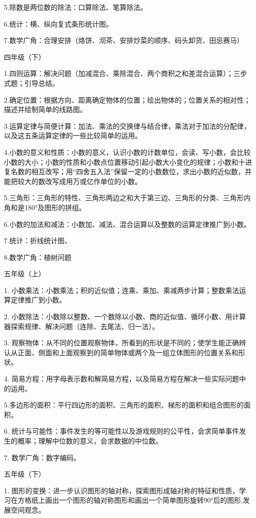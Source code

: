 5.除数是两位数的除法：口算除法、笔算除法。

6.统计：横、纵向复式条形统计图。

7.数学广角：合理安排（烙饼、沏茶、安排炒菜的顺序、码头卸货、田忌赛马）

四年级（下）

1.四则运算：解决问题（加减混合、乘除混合、两个商积之和差混合运算）；三步式题；引导总结。

2.确定位置：根据方向、距离确定物体的位置；绘出物体的；位置关系的相对性；描述并绘制简单的线路图。

3.运算定律与简便计算：加法、乘法的交换律与结合律，乘法对于加法的分配律，以及这五条运算定律的一些比较简单的运用。

4.小数的意义和性质：小数的意义，认识小数的计数单位，会读、写小数，会比较小数的大小；小数的性质和小数点位置移动引起小数大小变化的规律；小数和十进复名数的相互改写；用“四舍五入法”保留一定的小数数位，求出小数的近似数，并能把较大的数改写成用万或亿作单位的小数。

5.三角形：三角形的特性、三角形两边之和大于第三边、三角形的分类、三角形内角和是180°及图形的拼组。

6.小数的加法和减法：小数加、减法、混合运算以及整数的运算定律推广到小数。

7.统计：折线统计图、

8.数学广角：植树问题

五年级（上）

1. 小数乘法：小数乘法；积的近似值；连乘、乘加、乘减两步计算；整数乘法运算定律推广到小数。

2. 小数除法：小数除以整数、一个数除以小数、商的近似值、循环小数、用计算器探索规律、解决问题（连除、去尾法、归一法）。

3. 观察物体：从不同的位置观察物体，所看到的形状是不同的；使学生能正确辨认从正面、侧面和上面观察到的简单物体或两个及一组立体图形的位置关系和形状。

4. 简易方程：用字母表示数和解简易方程，以及简易方程在解决一些实际问题中的运用。

5.多边形的面积：平行四边形的面积、三角形的面积、梯形的面积和组合图形的面积。

6. 统计与可能性：事件发生的等可能性以及游戏规则的公平性，会求简单事件发生的概率；理解中位数的意义，会求数据的中位数。

7. 数学广角：数字编码。

五年级（下）

1. 图形的变换：进一步认识图形的轴对称，探索图形成轴对称的特征和性质，学习在方格纸上画出一个图形的轴对称图形和画出一个简单图形旋转90°后的图形,发展空间观念。

